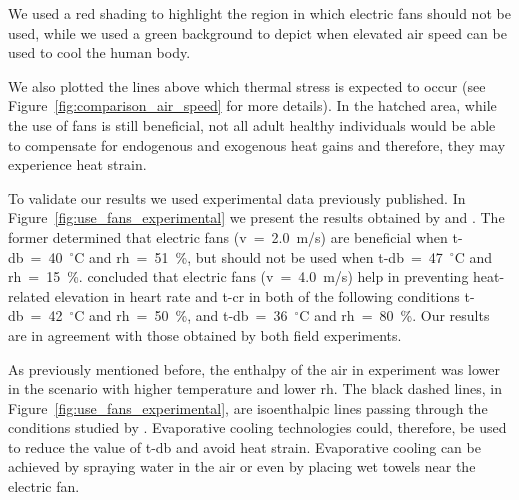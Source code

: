 We used a red shading to highlight the region in which electric fans should not be used, while we used a green background to depict when elevated air speed can be used to cool the human body.

We also plotted the lines above which thermal stress is expected to occur (see Figure~\ref{fig:comparison_air_speed} for more details).
In the hatched area, while the use of fans is still beneficial, not all adult healthy individuals would be able to compensate for endogenous and exogenous heat gains and therefore, they may experience heat strain.

To validate our results we used experimental data previously published.
In Figure~\ref{fig:use_fans_experimental} we present the results obtained by  and .
The former determined that electric fans (\ac{v}~=~2.0~m/s) are beneficial when \ac{t-db}~=~40~$^{\circ}$C and \ac{rh}~=~51~\%, but should not be used when \ac{t-db}~=~47~$^{\circ}$C and \ac{rh}~=~15~\%.
 concluded that electric fans (\ac{v}~=~4.0~m/s) help in preventing heat-related elevation in heart rate and \ac{t-cr} in both of the following conditions \ac{t-db}~=~42~$^{\circ}$C and \ac{rh}~=~50~\%, and \ac{t-db}~=~36~$^{\circ}$C and \ac{rh}~=~80~\%.
Our results are in agreement with those obtained by both field experiments.

As previously mentioned before, the enthalpy of the air in  experiment was lower in the scenario with higher temperature and lower \ac{rh}.
The black dashed lines, in Figure~\ref{fig:use_fans_experimental}, are isoenthalpic lines passing through the conditions studied by .
Evaporative cooling technologies could, therefore, be used to reduce the value of \ac{t-db} and avoid heat strain.
Evaporative cooling can be achieved by spraying water in the air or even by placing wet towels near the electric fan.

